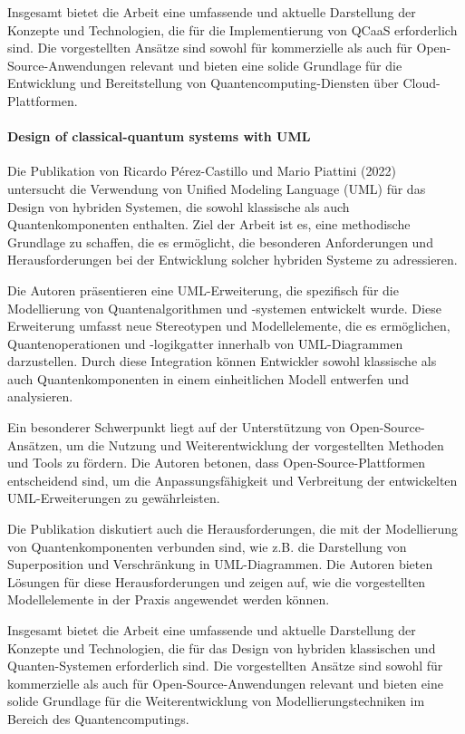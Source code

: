 Insgesamt bietet die Arbeit eine umfassende und aktuelle Darstellung der Konzepte und Technologien, die 
für die Implementierung von QCaaS erforderlich sind. Die vorgestellten Ansätze sind sowohl für 
kommerzielle als auch für Open-Source-Anwendungen relevant und bieten eine solide Grundlage für die 
Entwicklung und Bereitstellung von Quantencomputing-Diensten über Cloud-Plattformen.

\paragraph{Design of classical-quantum systems with UML}

Die Publikation von Ricardo Pérez-Castillo und Mario Piattini (2022)~\cite{Perez-Castillo_2022} untersucht die Verwendung von Unified Modeling 
Language (UML) für das Design von hybriden Systemen, die sowohl klassische als auch Quantenkomponenten enthalten. 
Ziel der Arbeit ist es, eine methodische Grundlage zu schaffen, die es ermöglicht, die besonderen Anforderungen und 
Herausforderungen bei der Entwicklung solcher hybriden Systeme zu adressieren.

Die Autoren präsentieren eine UML-Erweiterung, die spezifisch für die Modellierung von Quantenalgorithmen und -systemen 
entwickelt wurde. Diese Erweiterung umfasst neue Stereotypen und Modellelemente, die es ermöglichen, Quantenoperationen 
und -logikgatter innerhalb von UML-Diagrammen darzustellen. Durch diese Integration können Entwickler sowohl klassische 
als auch Quantenkomponenten in einem einheitlichen Modell entwerfen und analysieren.

Ein besonderer Schwerpunkt liegt auf der Unterstützung von Open-Source-Ansätzen, um die Nutzung und Weiterentwicklung der 
vorgestellten Methoden und Tools zu fördern. Die Autoren betonen, dass Open-Source-Plattformen entscheidend sind, um die 
Anpassungsfähigkeit und Verbreitung der entwickelten UML-Erweiterungen zu gewährleisten.

Die Publikation diskutiert auch die Herausforderungen, die mit der Modellierung von Quantenkomponenten verbunden sind, 
wie z.B. die Darstellung von Superposition und Verschränkung in UML-Diagrammen. Die Autoren bieten Lösungen für diese 
Herausforderungen und zeigen auf, wie die vorgestellten Modellelemente in der Praxis angewendet werden können.

Insgesamt bietet die Arbeit eine umfassende und aktuelle Darstellung der Konzepte und Technologien, die für das Design 
von hybriden klassischen und Quanten-Systemen erforderlich sind. Die vorgestellten Ansätze sind sowohl für kommerzielle 
als auch für Open-Source-Anwendungen relevant und bieten eine solide Grundlage für die Weiterentwicklung von Modellierungstechniken 
im Bereich des Quantencomputings.

